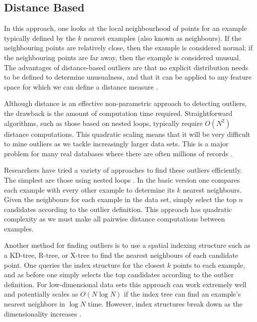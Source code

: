 \subsection{Distance Based}
\label{anomalyDetection:approaches:distance}
In this approach, one looks at the local neighbourhood of points for an example
typically defined by the $k$ nearest examples (also known as neighbours). If the
neighbouring points are relatively close, then the example is considered normal;
if the neighbouring points are far away, then the example is considered unusual.
The advantages of distance-based outliers are that no explicit distribution
needs to be defined to determine unusualness, and that it can be applied to any
feature space for which we can define a distance measure \cite{Bay:2003}.

Although distance is an effective non-parametric approach to detecting outliers,
the drawback is the amount of computation time required. Straightforward
algorithms, such as those based on nested loops, typically require $O(N^2)$
distance computations. This quadratic scaling means that it will be very
difficult to mine outliers as we tackle increasingly larger data sets. This is a
major problem for many real databases where there are often millions of records
\cite{Bay:2003}.

Researchers have tried a variety of approaches to find these outliers
efficiently. The simplest are those using nested loops \cite{Bay:2003}. In the
basic version one compares each example with every other example to determine
its $k$ nearest neighbours. Given the neighbours for each example in the data
set, simply select the top $n$ candidates according to the outlier definition.
This approach has quadratic complexity as we must make all pairwise distance
computations between examples.

Another method for finding outliers is to use a spatial indexing structure such
as a KD-tree, R-tree, or X-tree to find the nearest neighbours of each candidate
point. One queries the index structure for the closest $k$ points to each
example, and as before one simply selects the top candidates according to the
outlier definition. For low-dimensional data sets this approach can work
extremely well and potentially scales as $O(N \log N)$ if the index tree can
find an example's nearest neighbors in $\log N$ time. However, index structures
break down as the dimensionality increases \cite{Bay:2003}.

